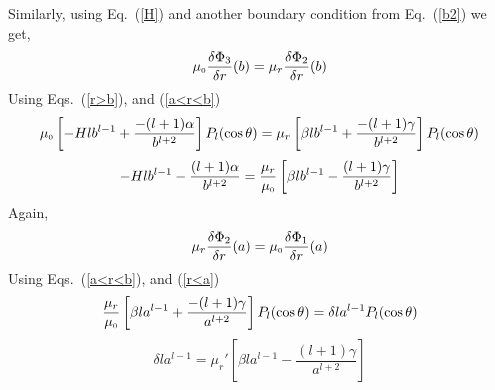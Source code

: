 Similarly, using Eq.~(\ref{H}) and another boundary condition from Eq.~(\ref{b2}) we get,
$$\mu_{\scriptscriptstyle 0}\frac{\delta \Phi_3}{\delta r}(b)=\mu_r\frac{\delta \Phi_2}{\delta r}(b)$$
Using Eqs.~(\ref{r>b}), and (\ref{a<r<b})
$$\mu_{\scriptscriptstyle 0}\left[-Hlb^{l-1}+\frac{-(l+1)\alpha}{b^{l+2}}\right]P_l(\cos\theta)=\mu_r\left[\beta l b^{l-1}+\frac{-(l+1)\gamma}{b^{l+2}}\right]P_l(\cos\theta)$$
\begin{equation}\label{e03}
-Hlb^{l-1}-\frac{(l+1)\alpha}{b^{l+2}}=\frac{\mu_r}{\mu_{\scriptscriptstyle 0}}\left[\beta l b^{l-1}-\frac{(l+1)\gamma}{b^{l+2}}\right]
\end{equation}
Again,
$$\mu_r\frac{\delta \Phi_2}{\delta r}(a)=\mu_{\scriptscriptstyle 0}\frac{\delta \Phi_1}{\delta r}(a)$$
Using Eqs.~(\ref{a<r<b}), and (\ref{r<a})
$$\frac{\mu_r}{\mu_{\scriptscriptstyle 0}}\left[\beta l a^{l-1}+\frac{-(l+1)\gamma}{a^{l+2}}\right]P_l(\cos\theta)=\delta l a^{l-1} P_l(\cos\theta)$$
\begin{equation}\label{e04}
\delta l a^{l-1}=\mu_r'\left[\beta l a^{l-1}-\frac{(l+1)\gamma}{a^{l+2}}\right]
\end{equation}





